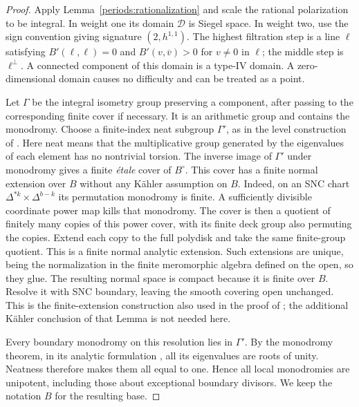 \begin{proof}
Apply Lemma~\ref{periods:rationalization} and scale the rational
polarization to be integral.  In weight one its domain $\mathcal D$ is
Siegel space.  In weight two, use the sign convention giving signature
$(2,h^{1,1})$.  The highest filtration step is a line $\ell$ satisfying
$B'(\ell,\ell)=0$ and $B'(v,\overline v)>0$ for $v\ne0$ in $\ell$;
the middle step is $\ell^\perp$.  A connected component of this domain
is a type-IV domain.  A zero-dimensional domain causes no difficulty and
can be treated as a point.

Let $\Gamma$ be the integral isometry group preserving a component, after
passing to the corresponding finite cover if necessary.  It is an
arithmetic group and contains the monodromy.  Choose a finite-index neat
subgroup $\Gamma'$, as in the level construction of
\cite[\S5.2]{BFMT25}.  Here neat means that the multiplicative group
generated by the eigenvalues of each element has no nontrivial torsion.
The inverse image of $\Gamma'$ under monodromy gives a finite \emph{\'etale}
cover of $B^\circ$.  This cover has a finite normal extension over $B$
without any K\"ahler assumption on $B$.  Indeed, on an SNC chart
$\Delta^{*k}\times\Delta^{b-k}$ its permutation monodromy is finite.
A sufficiently divisible coordinate power map kills that monodromy.
The cover is then a quotient of finitely many copies of this power
cover, with its finite deck group also permuting the copies.  Extend
each copy to the full polydisk and take the same finite-group quotient.
This is a finite normal analytic extension.  Such extensions are unique,
being the normalization in the finite meromorphic algebra defined on the
open, so they glue.  The resulting normal space is compact because it
is finite over $B$.  Resolve it with SNC boundary, leaving the smooth
covering open unchanged.  This is the finite-extension construction also
used in the proof of \cite[Lemma~2.21]{Villadsen24}; the additional
K\"ahler conclusion of that Lemma is not needed here.

Every boundary monodromy on this resolution lies in $\Gamma'$.
By the monodromy theorem, in its analytic formulation
\cite[Lemma~4.5]{Schmid73}, all its eigenvalues are roots of unity.
Neatness therefore makes them all equal to one.  Hence all local
monodromies are unipotent, including those about exceptional boundary
divisors.  We keep the notation $B$ for the resulting base.


\end{proof}
